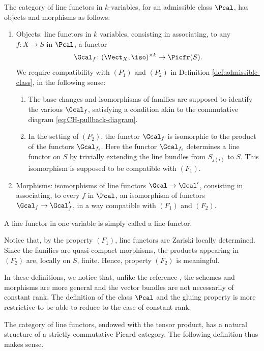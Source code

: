 \begin{definition}
The category of line functors in $k$-variables, for an admissible class $\Pcal$, has objects and morphisms as follows:
\begin{enumerate}
\item Objects: line functors in $k$ variables, consisting in associating, to any $f\colon X \to S$ in $\Pcal$, a functor
\begin{equation} \label{def:determinantfunctor}
\Gcal_f \colon (\Vect_{X}, \iso)^{\times k} \to \Picfr(S).
\end{equation}
We require compatibility with $(P_1)$ and $(P_2)$ in Definition \ref{def:admissible-class}, in the following sense:
\begin{enumerate}
\item[$(F_1)$] The base changes and isomorphisms of families are supposed to identify the various $\Gcal_{f}$, satisfying a condition akin to the commutative diagram \eqref{eq:CH-pullback-diagram}.
\item[$(F_2)$] In the setting of $(P_2)$, the functor $\Gcal_f$ is isomorphic to the product of the functors $\Gcal_{f_i}$. Here the functor $\Gcal_{f_i}$ determines a line functor on $S$ by trivially extending the line bundles from $S_{j(i)}$ to $S$. This isomorphism is supposed to be compatible with $(F_1)$.
\end{enumerate}
\item Morphisms: isomorphisms of line functors $\Gcal\to\Gcal^{\prime}$, consisting in associating, to every $f$ in $\Pcal$, an isomorphism of functors $\Gcal_{f}\to\Gcal_{f}^{\prime}$, in a way compatible with $(F_{1})$ and $(F_{2})$.
\end{enumerate}
A line functor in one variable is simply called a line functor.
\end{definition}
Notice that, by the property $(F_{1})$, line functors are Zariski locally determined. Since the families are quasi-compact morphisms, the products appearing in $(F_2)$ are, locally on $S$, finite. Hence, property $(F_2)$ is meaningful.

In these definitions, we notice that, unlike the reference \cite{Eriksson-Freixas-Wentworth}, the schemes and morphisms are more general and the vector bundles are not necessarily of constant rank. The definition of the class $\Pcal$ and the gluing property is more restrictive to be able to reduce to the case of constant rank.

The category of line functors, endowed with the tensor product, has a natural structure of a strictly commutative Picard category. The following definition thus makes sense.

